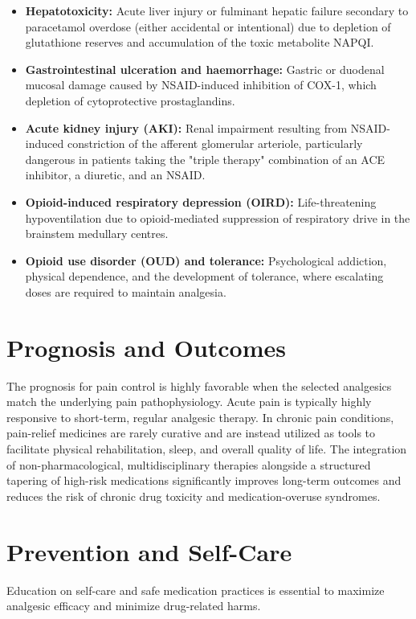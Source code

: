 \begin{itemize}
    \item \textbf{Hepatotoxicity:} Acute liver injury or fulminant hepatic failure secondary to paracetamol overdose (either accidental or intentional) due to depletion of glutathione reserves and accumulation of the toxic metabolite NAPQI.
    \item \textbf{Gastrointestinal ulceration and haemorrhage:} Gastric or duodenal mucosal damage caused by NSAID-induced inhibition of COX-1, which depletion of cytoprotective prostaglandins.
    \item \textbf{Acute kidney injury (AKI):} Renal impairment resulting from NSAID-induced constriction of the afferent glomerular arteriole, particularly dangerous in patients taking the "triple therapy" combination of an ACE inhibitor, a diuretic, and an NSAID.
    \item \textbf{Opioid-induced respiratory depression (OIRD):} Life-threatening hypoventilation due to opioid-mediated suppression of respiratory drive in the brainstem medullary centres.
    \item \textbf{Opioid use disorder (OUD) and tolerance:} Psychological addiction, physical dependence, and the development of tolerance, where escalating doses are required to maintain analgesia.
\end{itemize}

\section*{Prognosis and Outcomes}
The prognosis for pain control is highly favorable when the selected analgesics match the underlying pain pathophysiology. Acute pain is typically highly responsive to short-term, regular analgesic therapy. In chronic pain conditions, pain-relief medicines are rarely curative and are instead utilized as tools to facilitate physical rehabilitation, sleep, and overall quality of life. The integration of non-pharmacological, multidisciplinary therapies alongside a structured tapering of high-risk medications significantly improves long-term outcomes and reduces the risk of chronic drug toxicity and medication-overuse syndromes.

\section*{Prevention and Self-Care}
Education on self-care and safe medication practices is essential to maximize analgesic efficacy and minimize drug-related harms.

